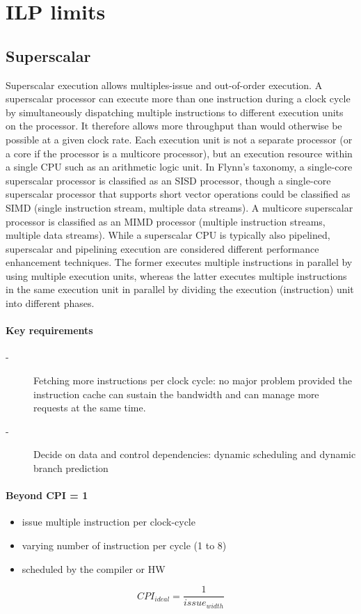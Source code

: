 \section{ILP limits}\label{sec:ilp-limits}
\subsection{Superscalar}\label{subsec:superscalar}
Superscalar execution allows multiples-issue and out-of-order execution.
A superscalar processor can execute more than one instruction during a clock cycle by simultaneously
dispatching multiple instructions to different execution units on the processor.
It therefore allows more throughput than would otherwise be possible at a given clock rate.
Each execution unit is not a separate processor (or a core if the processor is a multicore processor), but an
execution resource within a single CPU such as an arithmetic logic unit.
In Flynn's taxonomy, a single-core superscalar processor is classified as an SISD processor, though a single-core
superscalar processor that supports short vector operations could be classified as SIMD (single instruction stream,
multiple data streams).
A multicore superscalar processor is classified as an MIMD processor (multiple instruction streams, multiple data streams).
While a superscalar CPU is typically also pipelined, superscalar and pipelining execution are considered different
performance enhancement techniques.
The former executes multiple instructions in parallel by using multiple execution units, whereas the latter executes
multiple instructions in the same execution unit in parallel by dividing the execution (instruction) unit into
different phases.

\paragraph{Key requirements}
\begin{description}
    \item[-] Fetching more instructions per clock cycle: no major problem provided the instruction cache can sustain
    the bandwidth and can manage more requests at the same time.
    \item[-] Decide on data and control dependencies: dynamic scheduling and dynamic branch prediction
\end{description}

\paragraph{Beyond CPI = 1} 
\begin{itemize}[noitemsep]
    \item issue multiple instruction per clock-cycle
    \item varying number of instruction per cycle (1 to 8)
    \item scheduled by the compiler or HW
\end{itemize}
\[CPI_{ideal} =\frac{1}{issue_{width}}\]



